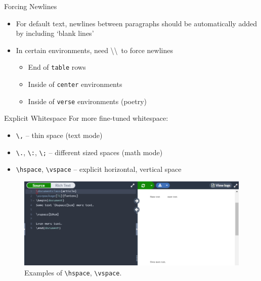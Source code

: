 \documentclass{beamer}
\begin{document}
{  \begin{frame}{Forcing Newlines}
    \begin{itemize}
      \item For default text, newlines between paragraphs should be automatically added by including `blank lines'
      \item In certain environments, need \textbackslash\textbackslash \, to force newlines
      \begin{itemize}
        \item End of \texttt{table} rows
        \item Inside of \texttt{center} environments
        \item Inside of \texttt{verse} environments (poetry)
      \end{itemize}
    \end{itemize}
  \end{frame}

  \begin{frame}{Explicit Whitespace}
    For more fine-tuned whitespace:
    \begin{itemize}
      \item \texttt{\textbackslash,} -- thin space (text mode)
      \item \texttt{\textbackslash.}, \texttt{\textbackslash:}, \texttt{\textbackslash;} -- different sized spaces (math mode)
      \item \texttt{\textbackslash hspace}, \texttt{\textbackslash vspace} -- explicit horizontal, vertical space
    \end{itemize}
    \begin{figure}
      \includegraphics[width=0.8\linewidth]{day02-02B-explicit.png}
      \caption{Examples of \texttt{\textbackslash hspace}, \texttt{\textbackslash vspace}.}
      \label{fig:day02-02B}
    \end{figure}
  \end{frame}

}
\end{document}
